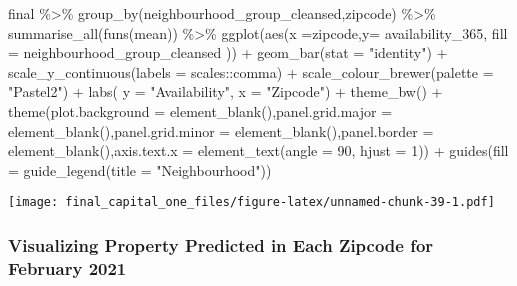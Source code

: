 \documentclass[
]{article}
\newenvironment{Shaded}{\begin{snugshade}}{\end{snugshade}}
\newcommand{\AttributeTok}[1]{\textcolor[rgb]{0.77,0.63,0.00}{#1}}
\newcommand{\DecValTok}[1]{\textcolor[rgb]{0.00,0.00,0.81}{#1}}
\newcommand{\FunctionTok}[1]{\textcolor[rgb]{0.00,0.00,0.00}{#1}}
\newcommand{\NormalTok}[1]{#1}
\newcommand{\SpecialCharTok}[1]{\textcolor[rgb]{0.00,0.00,0.00}{#1}}
\newcommand{\StringTok}[1]{\textcolor[rgb]{0.31,0.60,0.02}{#1}}
\begin{document}
\begin{Shaded}
\begin{Highlighting}[]
\NormalTok{final }\SpecialCharTok{\%\textgreater{}\%} \FunctionTok{group\_by}\NormalTok{(neighbourhood\_group\_cleansed,zipcode) }\SpecialCharTok{\%\textgreater{}\%} \FunctionTok{summarise\_all}\NormalTok{(}\FunctionTok{funs}\NormalTok{(mean)) }\SpecialCharTok{\%\textgreater{}\%} \FunctionTok{ggplot}\NormalTok{(}\FunctionTok{aes}\NormalTok{(}\AttributeTok{x =}\NormalTok{zipcode,}\AttributeTok{y=}\NormalTok{ availability\_365, }\AttributeTok{fill =}\NormalTok{ neighbourhood\_group\_cleansed )) }\SpecialCharTok{+} \FunctionTok{geom\_bar}\NormalTok{(}\AttributeTok{stat =} \StringTok{"identity"}\NormalTok{) }\SpecialCharTok{+} \FunctionTok{scale\_y\_continuous}\NormalTok{(}\AttributeTok{labels =}\NormalTok{ scales}\SpecialCharTok{::}\NormalTok{comma) }\SpecialCharTok{+}  \FunctionTok{scale\_colour\_brewer}\NormalTok{(}\AttributeTok{palette =} \StringTok{"Pastel2"}\NormalTok{) }\SpecialCharTok{+} \FunctionTok{labs}\NormalTok{( }\AttributeTok{y =} \StringTok{"Availability"}\NormalTok{, }\AttributeTok{x =} \StringTok{"Zipcode"}\NormalTok{) }\SpecialCharTok{+} \FunctionTok{theme\_bw}\NormalTok{() }\SpecialCharTok{+} \FunctionTok{theme}\NormalTok{(}\AttributeTok{plot.background =} \FunctionTok{element\_blank}\NormalTok{(),}\AttributeTok{panel.grid.major =} \FunctionTok{element\_blank}\NormalTok{(),}\AttributeTok{panel.grid.minor =} \FunctionTok{element\_blank}\NormalTok{(),}\AttributeTok{panel.border =} \FunctionTok{element\_blank}\NormalTok{(),}\AttributeTok{axis.text.x =} \FunctionTok{element\_text}\NormalTok{(}\AttributeTok{angle =} \DecValTok{90}\NormalTok{, }\AttributeTok{hjust =} \DecValTok{1}\NormalTok{)) }\SpecialCharTok{+} \FunctionTok{guides}\NormalTok{(}\AttributeTok{fill =} \FunctionTok{guide\_legend}\NormalTok{(}\AttributeTok{title =} \StringTok{"Neighbourhood"}\NormalTok{)) }
\end{Highlighting}
\end{Shaded}

\texttt{[image: final\_capital\_one\_files/figure-latex/unnamed-chunk-39-1.pdf]}

\hypertarget{visualizing-property-predicted-in-each-zipcode-for-february-2021}{%
\subsubsection{Visualizing Property Predicted in Each Zipcode for
February
2021}\label{visualizing-property-predicted-in-each-zipcode-for-february-2021}}
\end{document}
